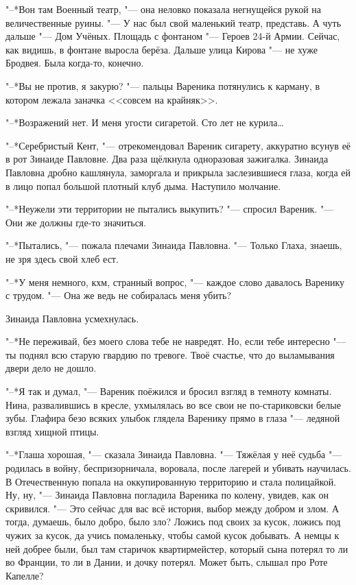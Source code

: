 "--*Вон там Военный театр, "--- она неловко показала негнущейся рукой на величественные руины.
"--- У нас был свой маленький театр, представь.
А чуть дальше "--- Дом Учёных.
Площадь с фонтаном "--- Героев 24-й Армии.
Сейчас, как видишь, в фонтане выросла берёза.
Дальше улица Кирова "--- не хуже Бродвея.
Была когда-то, конечно.

"--*Вы не против, я закурю? "--- пальцы Вареника потянулись к карману, в котором лежала заначка <<совсем на крайняк>>.

"--*Возражений нет.
И меня угости сигаретой.
Сто лет не курила\ldots{}

"--*Серебристый Кент, "--- отрекомендовал Вареник сигарету, аккуратно всунув её в рот Зинаиде Павловне.
Два раза щёлкнула одноразовая зажигалка.
Зинаида Павловна дробно кашлянула, заморгала и прикрыла заслезившиеся глаза, когда ей в лицо попал большой плотный клуб дыма.
Наступило молчание.

"--*Неужели эти территории не пытались выкупить? "--- спросил Вареник.
"--- Они же должны где-то значиться.

"--*Пытались, "--- пожала плечами Зинаида Павловна.
"--- Только Глаха, знаешь, не зря здесь свой хлеб ест.

"--*У меня немного, кхм, странный вопрос, "--- каждое слово давалось Варенику с трудом.
"--- Она же ведь не собиралась меня убить?

Зинаида Павловна усмехнулась.

"--*Не переживай, без моего слова тебе не навредят.
Но, если тебе интересно "--- ты поднял всю старую гвардию по тревоге.
Твоё счастье, что до выламывания двери дело не дошло.

"--*Я так и думал, "--- Вареник поёжился и бросил взгляд в темноту комнаты.
Нина, развалившись в кресле, ухмылялась во все свои не по-стариковски белые зубы.
Глафира безо всяких улыбок глядела Варенику прямо в глаза "--- ледяной взгляд хищной птицы.

"--*Глаша хорошая, "--- сказала Зинаида Павловна.
"--- Тяжёлая у неё судьба "--- родилась в войну, беспризорничала, воровала, после лагерей и убивать научилась.
В Отечественную попала на оккупированную территорию и стала полицайкой.
Ну, ну, "--- Зинаида Павловна погладила Вареника по колену, увидев, как он скривился.
"--- Это сейчас для вас всё история, выбор между добром и злом.
А тогда, думаешь, было добро, было зло?
Ложись под своих за кусок, ложись под чужих за кусок, да учись помаленьку, чтобы самой кусок добывать.
А немцы к ней добрее были, был там старичок квартирмейстер, который сына потерял то ли во Франции, то ли в Дании, и дочку потерял.
Может быть, слышал про Роте Капелле?

